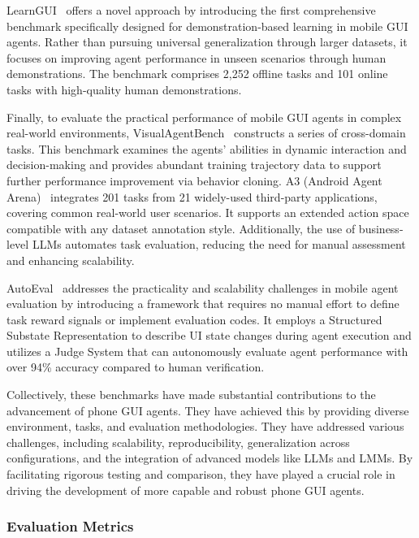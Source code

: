 LearnGUI~\cite{liu2025learnact} offers a novel approach by introducing the first comprehensive benchmark specifically designed for demonstration-based learning in mobile GUI agents. Rather than pursuing universal generalization through larger datasets, it focuses on improving agent performance in unseen scenarios through human demonstrations. The benchmark comprises 2,252 offline tasks and 101 online tasks with high-quality human demonstrations.

Finally, to evaluate the practical performance of mobile GUI agents in complex real-world environments, VisualAgentBench~\cite{liu2024visualagentbench} constructs a series of cross-domain tasks. This benchmark examines the agents' abilities in dynamic interaction and decision-making and provides abundant training trajectory data to support further performance improvement via behavior cloning. A3 (Android Agent Arena)~\cite{chai2025a3} integrates 201 tasks from 21 widely-used third-party applications, covering common real-world user scenarios. It supports an extended action space compatible with any dataset annotation style. Additionally, the use of business-level LLMs automates task evaluation, reducing the need for manual assessment and enhancing scalability.

AutoEval~\cite{sun2025autoeval} addresses the practicality and scalability challenges in mobile agent evaluation by introducing a framework that requires no manual effort to define task reward signals or implement evaluation codes. It employs a Structured Substate Representation to describe UI state changes during agent execution and utilizes a Judge System that can autonomously evaluate agent performance with over 94\% accuracy compared to human verification.

Collectively, these benchmarks have made substantial contributions to the advancement of phone GUI agents. They have achieved this by providing diverse environment, tasks, and evaluation methodologies. They have addressed various challenges, including scalability, reproducibility, generalization across configurations, and the integration of advanced models like LLMs and LMMs. By facilitating rigorous testing and comparison, they have played a crucial role in driving the development of more capable and robust phone GUI agents.

\subsubsection{Evaluation Metrics}
\label{subsec:eval_metrics}

